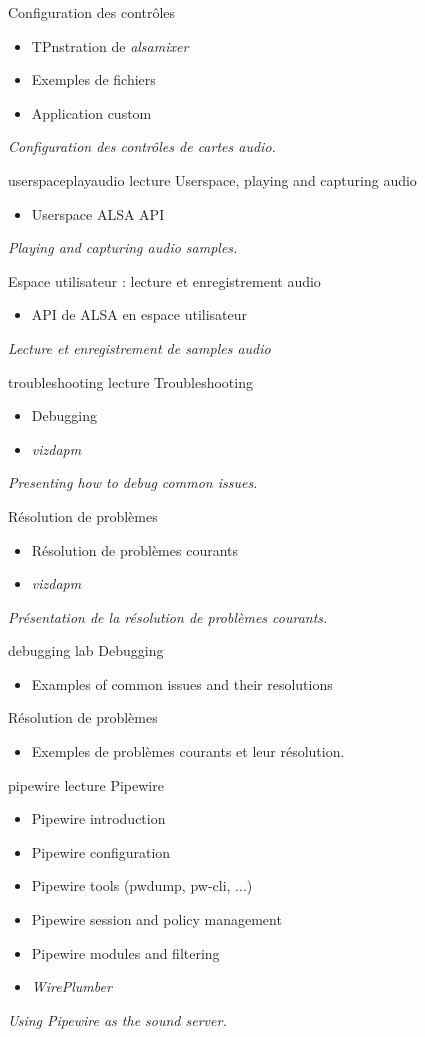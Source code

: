 {Configuration des contrôles}
{
  \begin{itemize}
  \item TPnstration de {\em alsamixer}
  \item Exemples de fichiers 
  \item Application custom
  \end{itemize}
  \vspace{0.5em}
  {\em Configuration des contrôles de cartes audio.}
}
{userspaceplayaudio}
{lecture}
{Userspace, playing and capturing audio}
{
  \begin{itemize}
  \item Userspace ALSA API
  \end{itemize}
  \vspace{0.5em}
  {\em Playing and capturing audio samples.}
}
{Espace utilisateur : lecture et enregistrement audio}
{
  \begin{itemize}
  \item API de ALSA en espace utilisateur
  \end{itemize}
  \vspace{0.5em}
  {\em Lecture et enregistrement de samples audio}
}
{troubleshooting}
{lecture}
{Troubleshooting}
{
  \begin{itemize}
  \item Debugging
  \item {\em vizdapm}
  \end{itemize}
  \vspace{0.5em}
  {\em Presenting how to debug common issues.}
}
{Résolution de problèmes}
{
  \begin{itemize}
  \item Résolution de problèmes courants
  \item {\em vizdapm}
  \end{itemize}
  \vspace{0.5em}
  {\em Présentation de la résolution de problèmes courants.}
}
{debugging}
{lab}
{Debugging}
{
  \begin{itemize}
  \item Examples of common issues and their resolutions
  \end{itemize}
}
{Résolution de problèmes}
{
  \begin{itemize}
  \item Exemples de problèmes courants et leur résolution.
  \end{itemize}
}
{pipewire}
{lecture}
{Pipewire}
{
  \begin{itemize}
  \item Pipewire introduction
  \item Pipewire configuration
  \item Pipewire tools (pwdump, pw-cli, ...)
  \item Pipewire session and policy management
  \item Pipewire modules and filtering
  \item {\em WirePlumber}
  \end{itemize}
  \vspace{0.5em}
  {\em Using Pipewire as the sound server.}
}
